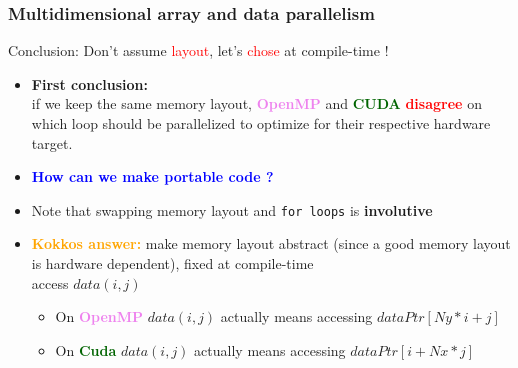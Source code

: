 \begin{frame}[fragile=singleslide]
  \frametitle{Multidimensional array and data parallelism}

  \begin{block}{Conclusion:}
    {\Large Don't assume \textcolor{red}{layout}, let's \textcolor{red}{chose} at compile-time !}
  \end{block}
  
  \begin{itemize}
  \item {\bf First conclusion:}\\
    if we keep the same memory layout, \textcolor{violet}{\bf OpenMP} and \textcolor{darkgreen}{\bf CUDA} \textcolor{red}{\bf disagree} on which loop should be parallelized to optimize for their respective hardware target.
  \item \textcolor{blue}{\bf How can we make portable code ?}
  \item Note that swapping memory layout and {\tt for loops} is {\bf involutive}
  \item \textcolor{orange}{\bf Kokkos answer:} make memory layout abstract (since a good memory layout is hardware dependent), fixed at compile-time\\
    access $data(i,j)$
    \begin{itemize}
    \item On \textcolor{violet}{\bf OpenMP} $data(i,j)$ actually means accessing $dataPtr[Ny*i+j]$
    \item On \textcolor{darkgreen}{\bf Cuda} $data(i,j)$ actually means accessing $dataPtr[i+Nx*j]$
    \end{itemize}
  \end{itemize}
  
\end{frame}

